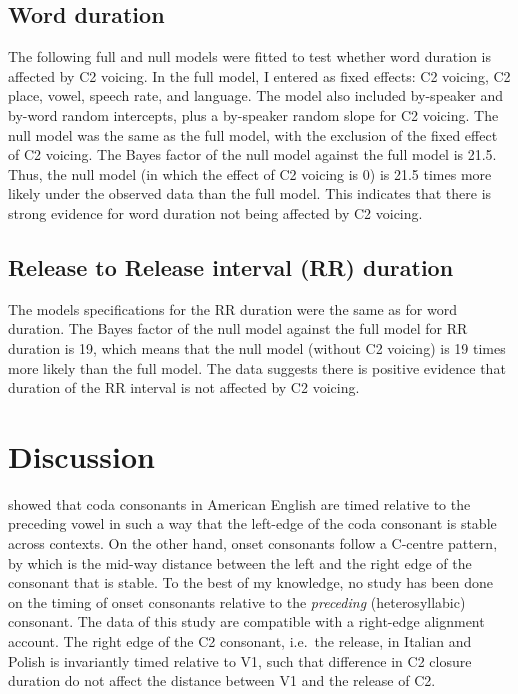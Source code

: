 \documentclass[]{JASAnew}
\begin{document}
\hypertarget{word-duration}{%
\subsection{Word duration}\label{word-duration}}

The following full and null models were fitted to test whether word
duration is affected by C2 voicing. In the full model, I entered as
fixed effects: C2 voicing, C2 place, vowel, speech rate, and language.
The model also included by-speaker and by-word random intercepts, plus a
by-speaker random slope for C2 voicing. The null model was the same as
the full model, with the exclusion of the fixed effect of C2 voicing.
The Bayes factor of the null model against the full model is 21.5. Thus,
the null model (in which the effect of C2 voicing is 0) is 21.5 times
more likely under the observed data than the full model. This indicates
that there is strong evidence for word duration not being affected by C2
voicing.

\hypertarget{release-to-release-interval-rr-duration}{%
\subsection{Release to Release interval (RR)
duration}\label{release-to-release-interval-rr-duration}}

The models specifications for the RR duration were the same as for word
duration. The Bayes factor of the null model against the full model for
RR duration is 19, which means that the null model (without C2 voicing)
is 19 times more likely than the full model. The data suggests there is
positive evidence that duration of the RR interval is not affected by C2
voicing.

\hypertarget{discussion}{%
\section{Discussion}\label{discussion}}

\citet{marin2010} showed that coda consonants in American English are
timed relative to the preceding vowel in such a way that the left-edge
of the coda consonant is stable across contexts. On the other hand,
onset consonants follow a C-centre pattern, by which is the mid-way
distance between the left and the right edge of the consonant that is
stable. To the best of my knowledge, no study has been done on the
timing of onset consonants relative to the \emph{preceding}
(heterosyllabic) consonant. The data of this study are compatible with a
right-edge alignment account. The right edge of the C2 consonant,
i.e.~the release, in Italian and Polish is invariantly timed relative to
V1, such that difference in C2 closure duration do not affect the
distance between V1 and the release of C2.
\end{document}
